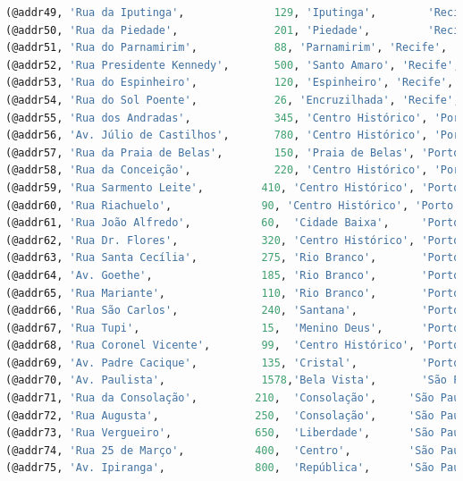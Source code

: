 \documentclass[12pt,a4paper]{report}
\begin{document}
\begin{lstlisting}[language=SQL, caption=population.sql]
(@addr49, 'Rua da Iputinga',              129, 'Iputinga',        'Recife',    'PE', '50740-030'),
(@addr50, 'Rua da Piedade',               201, 'Piedade',         'Recife',    'PE', '54400-350'),
(@addr51, 'Rua do Parnamirim',            88, 'Parnamirim', 'Recife', 'PE', '52060-000'),
(@addr52, 'Rua Presidente Kennedy',       500, 'Santo Amaro', 'Recife', 'PE', '51350-610'),
(@addr53, 'Rua do Espinheiro',            120, 'Espinheiro', 'Recife', 'PE', '52020-020'),
(@addr54, 'Rua do Sol Poente',            26, 'Encruzilhada', 'Recife', 'PE', '52030-090'),
(@addr55, 'Rua dos Andradas',             345, 'Centro Histórico', 'Porto Alegre', 'RS', '90020-002'),
(@addr56, 'Av. Júlio de Castilhos',       780, 'Centro Histórico', 'Porto Alegre', 'RS', '90030-130'),
(@addr57, 'Rua da Praia de Belas',        150, 'Praia de Belas', 'Porto Alegre', 'RS', '90110-000'),
(@addr58, 'Rua da Conceição',             220, 'Centro Histórico', 'Porto Alegre', 'RS', '90030-030'),
(@addr59, 'Rua Sarmento Leite',         410, 'Centro Histórico', 'Porto Alegre', 'RS', '90050-170'),
(@addr60, 'Rua Riachuelo',              90, 'Centro Histórico', 'Porto Alegre', 'RS', '90010-270'),
(@addr61, 'Rua João Alfredo',           60,  'Cidade Baixa',     'Porto Alegre', 'RS', '90050-230'),
(@addr62, 'Rua Dr. Flores',             320, 'Centro Histórico', 'Porto Alegre', 'RS', '90020-123'),
(@addr63, 'Rua Santa Cecília',          275, 'Rio Branco',       'Porto Alegre', 'RS', '90420-041'),
(@addr64, 'Av. Goethe',                 185, 'Rio Branco',       'Porto Alegre', 'RS', '90430-100'),
(@addr65, 'Rua Mariante',               110, 'Rio Branco',       'Porto Alegre', 'RS', '90430-180'),
(@addr66, 'Rua São Carlos',             240, 'Santana',          'Porto Alegre', 'RS', '90810-027'),
(@addr67, 'Rua Tupi',                   15,  'Menino Deus',      'Porto Alegre', 'RS', '90110-070'),
(@addr68, 'Rua Coronel Vicente',        99,  'Centro Histórico', 'Porto Alegre', 'RS', '90010-000'),
(@addr69, 'Av. Padre Cacique',          135, 'Cristal',          'Porto Alegre', 'RS', '90810-000'),
(@addr70, 'Av. Paulista',               1578,'Bela Vista',       'São Paulo',    'SP', '01310-200'),
(@addr71, 'Rua da Consolação',         210,  'Consolação',     'São Paulo', 'SP', '01302-000'),
(@addr72, 'Rua Augusta',               250,  'Consolação',     'São Paulo', 'SP', '01305-000'),
(@addr73, 'Rua Vergueiro',             650,  'Liberdade',      'São Paulo', 'SP', '01504-001'),
(@addr74, 'Rua 25 de Março',           400,  'Centro',         'São Paulo', 'SP', '01021-200'),
(@addr75, 'Av. Ipiranga',              800,  'República',      'São Paulo', 'SP', '01046-000'),

\end{lstlisting}
\end{document}
